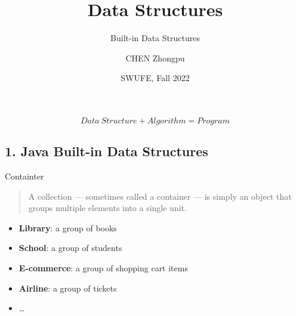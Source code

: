 \documentclass[aspectratio=169, 14pt]{beamer}
\title[Data Structures] %
{Data Structures}
\subtitle{Built-in Data Structures}
\author[CHEN Zhongpu] %
{CHEN Zhongpu}
\institute[] %
{
  School of Computing and Artificial Intelligence \\
  \href{mailto:zpchen@swufe.edu.cn}{zpchen@swufe.edu.cn}
}
\date[] %
{SWUFE, Fall 2022}
\begin{document}
\frame{\titlepage}

\begin{frame}
    \Large $$Data\ Structure + Algorithm = Program$$
\end{frame}

{
    \begin{frame}
        \section{\textcolor{darkmidnightblue}{1. Java Built-in Data Structures}}
    \end{frame}

}

\begin{frame}{Containter}
    \begin{quote}
        A \alert{collection} — sometimes called a \alert{container} — is simply an object that groups multiple elements into a single unit.
    \end{quote}

    \begin{itemize}
        \item \textbf{Library}: a group of books
        \item \textbf{School}: a group of students
        \item \textbf{E-commerce}: a group of shopping cart items
        \item \textbf{Airline}: a group of tickets 
        \item \dots
    \end{itemize}
\end{frame}
\end{document}
